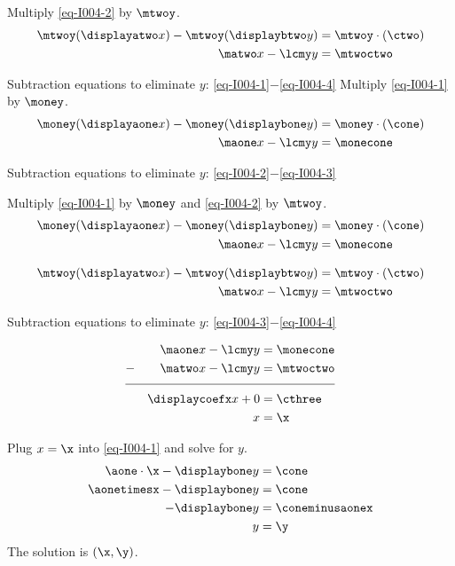 \begin{solution}

 
\ifnum{}
	Multiply \eqref{eq-I004-2} by $\mtwoy$.
	\begin{align}
	\mtwoy(\displayatwo x) - \mtwoy(\displaybtwo y) &=\mtwoy\cdot(\ctwo) \nonumber \\
	\matwo x - \lcmy y &= \mtwoctwo \label{eq-I004-4}
	\end{align}

	Subtraction equations to eliminate $y$: \eqref{eq-I004-1}$-$\eqref{eq-I004-4} 
\else
	\ifnum{} 
		Multiply \eqref{eq-I004-1} by $\money$.
		\begin{align}
		\money(\displayaone x) - \money(\displaybone y) &=\money\cdot(\cone) \nonumber \\
		\maone x - \lcmy y &= \monecone \label{eq-I004-3}
		\end{align}
		
		Subtraction equations to eliminate $y$: \eqref{eq-I004-2}$-$\eqref{eq-I004-3} 

	\else
		Multiply \eqref{eq-I004-1} by $\money$ and \eqref{eq-I004-2} by $\mtwoy$.
		\begin{align}
		\money(\displayaone x) - \money(\displaybone y) &=\money\cdot(\cone) \nonumber \\
		\maone x - \lcmy y &= \monecone \label{eq-I004-3}
		\end{align}

		\begin{align}
		\mtwoy(\displayatwo x) - \mtwoy(\displaybtwo y) &=\mtwoy\cdot(\ctwo) \nonumber \\
		\matwo x - \lcmy y &= \mtwoctwo \label{eq-I004-4}
		\end{align}

		Subtraction equations to eliminate $y$: \eqref{eq-I004-3}$-$\eqref{eq-I004-4} 
	\fi
\fi


\begin{align}
&& \maone x - \lcmy y &= \monecone \nonumber \\
-&& \matwo x - \lcmy y &= \mtwoctwo  \nonumber\\[-0.5em]
\cline{1-4}
&& \displaycoefx x+0 &=\cthree \nonumber\\
&& x&=\x\nonumber
\end{align}



Plug $x=\x$ into \eqref{eq-I004-1} and solve for $y$.
\begin{align*}
\aone\cdot \x- \displaybone y &=\cone \\
\aonetimesx-\displaybone y&= \cone\\
-\displaybone y&= \coneminusaonex \\
y&=\y
\end{align*}
The solution is $(\x,\y)$. 

\end{solution}
